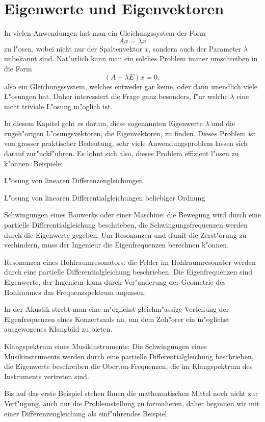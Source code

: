 \chapter{Eigenwerte und Eigenvektoren\label{chapter-eigen}}
In vielen Anwendungen hat man ein Gleichungssystem der Form
\[
Ax=\lambda x
\]
zu l"osen, wobei nicht nur der Spaltenvektor $x$, sondern auch der
Parameter $\lambda$ unbekannt sind.
Nat"urlich kann man ein solches Problem immer umschreiben in die Form
\[
(A-\lambda E) x=0,
\]
also ein Gleichungssystem, welches entweder gar keine, oder dann
unendlich viele L"osungen hat.
Daher interessiert die Frage 
ganz besonders, f"ur welche $\lambda$ eine nicht triviale L"osung m"oglich ist.

In diesem Kapitel geht es darum, diese sogenannten Eigenwerte $\lambda$
und die zugeh"origen L"osungsvektoren, die Eigenvektoren, zu finden.
Dieses
Problem ist von grosser praktischer Bedeutung, sehr viele Anwendungsproblem
lassen sich darauf zur"uckf"uhren.
Es lohnt sich also, dieses Problem
effizient l"osen zu k"onnen.
Beispiele:
\begin{compactitem}
\item L"osung von linearen Differenzengleichungen
\item L"osung von linearen Differentialgleichungen beliebiger Ordnung
\item Schwingungen eines Bauwerks oder einer Maschine: die Bewegung wird durch
eine partielle Differentialgleichung beschrieben, die Schwingungsfrequenzen
werden durch die Eigenwerte gegeben.
Um Resonanzen und damit die Zerst"orung
zu verhindern, muss der Ingenieur die Eigenfrequenzen
berechnen k"onnen.
\item Resonanzen eines Hohlraumresonators: die Felder im Hohlraumresonator
werden durch eine partielle Differentialgleichung beschrieben.
Die Eigenfrequenzen sind Eigenwerte, der Ingenieur kann durch Ver"anderung
der Geometrie des Hohlraumes das Frequenzspektrum anpassen.
\item
{}
In der
Akustik strebt man eine m"oglichst gleichm"assige Verteilung der Eigenfrequenzen
eines Konzertsaals an, um dem Zuh"orer ein m"oglichst ausgewogenes Klangbild
zu bieten.
\item Klangspektrum eines Musikinstruments: Die Schwingungen eines Musikinstruments
werden durch eine partielle Differentialgleichung beschrieben, die
Eigenwerte beschreiben die Oberton-Frequenzen, die im Klangspektrum des
Instruments vertreten sind.
\end{compactitem}
Bis auf das erste Beispiel stehen Ihnen die mathematischen Mittel noch nicht
zur Verf"ugung, auch nur die Problemstellung zu formulieren, daher beginnen
wir mit einer Differenzengleichung als einf"uhrendes Beispiel.

